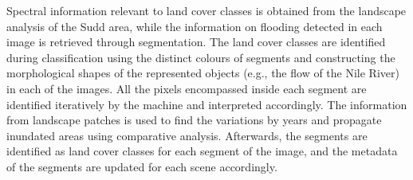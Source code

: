 \documentclass[analytics,article,accept,pdftex,moreauthors]{Definitions/mdpi}
\begin{document}
Spectral information relevant to land cover classes is obtained from the landscape analysis of the Sudd area, while the information on flooding detected in each image is retrieved through segmentation. The land cover classes are identified during classification using the distinct colours of segments and constructing the morphological shapes of the represented objects (e.g., the flow of the Nile River) in each of the images. All the pixels encompassed inside each segment are identified iteratively by the machine and interpreted accordingly. The information from landscape patches is used to find the variations by years and propagate inundated areas using comparative analysis. Afterwards, the segments are identified as land cover classes for each segment of the image, and the metadata of the segments are updated for each scene accordingly. 
\end{document}
